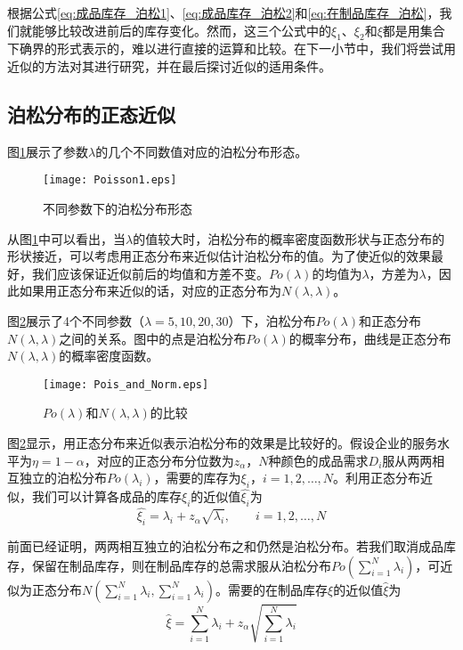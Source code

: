 根据公式\ref{eq:成品库存_泊松1}、\ref{eq:成品库存_泊松2}和\ref{eq:在制品库存_泊松}，我们就能够比较改进前后的库存变化。然而，这三个公式中的$\xi_1$、$\xi_2$和$\xi$都是用集合下确界的形式表示的，难以进行直接的运算和比较。在下一小节中，我们将尝试用近似的方法对其进行研究，并在最后探讨近似的适用条件。




\subsection{泊松分布的正态近似}

图\ref{fig:泊松分布形态}展示了参数$\lambda$的几个不同数值对应的泊松分布形态。

\begin{figure}[htbp]
\centering
\texttt{[image: Poisson1.eps]}
\caption{不同参数下的泊松分布形态}
\label{fig:泊松分布形态}
\end{figure}

从图\ref{fig:泊松分布形态}中可以看出，当$\lambda$的值较大时，泊松分布的概率密度函数形状与正态分布的形状接近，可以考虑用正态分布来近似估计泊松分布的值。为了使近似的效果最好，我们应该保证近似前后的均值和方差不变。$Po(\lambda)$的均值为$\lambda$，方差为$\lambda$，因此如果用正态分布来近似的话，对应的正态分布为$N(\lambda,\lambda)$。

图\ref{fig:泊松分布和正态分布的比较}展示了4个不同参数（$\lambda=5,10,20,30$）下，泊松分布$Po(\lambda)$和正态分布$N(\lambda,\lambda)$之间的关系。图中的点是泊松分布$Po(\lambda)$的概率分布，曲线是正态分布$N(\lambda,\lambda)$的概率密度函数。

\begin{figure}[htb]
\centering
\texttt{[image: Pois\_and\_Norm.eps]}
\caption{$Po(\lambda)$和$N(\lambda,\lambda)$的比较}
\label{fig:泊松分布和正态分布的比较}
\end{figure}

图\ref{fig:泊松分布和正态分布的比较}显示，用正态分布来近似表示泊松分布的效果是比较好的。假设企业的服务水平为$\eta=1-\alpha$，对应的正态分布分位数为$z_\alpha$，$N$种颜色的成品需求$D_i$服从两两相互独立的泊松分布$Po(\lambda_i)$，需要的库存为$\xi_i$，$i=1,2,\ldots,N$。利用正态分布近似，我们可以计算各成品的库存$\xi_i$的近似值$\hat{\xi_i}$为
\begin{equation}
\hat{\xi_i} = \lambda_i + z_\alpha\sqrt{\lambda_i},\qquad i=1,2,\ldots,N
\label{eq:正态近似下的成品库存}
\end{equation}

前面已经证明，两两相互独立的泊松分布之和仍然是泊松分布。若我们取消成品库存，保留在制品库存，则在制品库存的总需求服从泊松分布$Po(\sum_{i=1}^N\lambda_i)$，可近似为正态分布$N(\sum_{i=1}^N\lambda_i,\sum_{i=1}^N\lambda_i)$。需要的在制品库存$\xi$的近似值$\hat{\xi}$为
\begin{equation}
\hat{\xi} = \sum_{i=1}^N\lambda_i + z_\alpha\sqrt{\sum_{i=1}^N\lambda_i}
\label{eq:正态近似下的在制品库存}
\end{equation}

